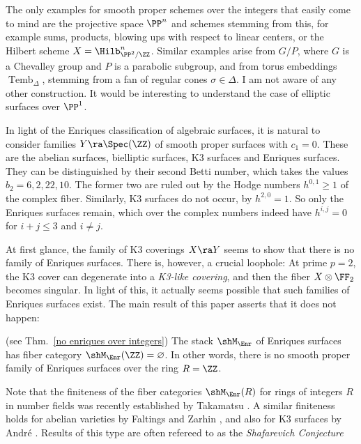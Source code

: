 The only examples for smooth proper schemes over the integers that easily come to mind
are  the projective space $\PP^n$ and schemes   stemming from this,
for example sums, products,   blowing ups with respect to linear centers, or the Hilbert scheme
$X=\Hilb^n_{\PP^2/\ZZ}$.
Similar examples arise from $G/P$, where $G$ is a Chevalley group  and $P$ is a  parabolic subgroup,
and from   torus embeddings $\operatorname{Temb}_\Delta$, stemming from a  fan of regular cones $\sigma\in\Delta$.
I am not aware of any other construction. It would be interesting to understand the case of   elliptic surfaces over $\PP^1$.

In light of the Enriques classification of algebraic surfaces, it is natural to consider  families
$Y\ra \Spec(\ZZ)$ of smooth proper surfaces with $c_1=0$.
These are the abelian surfaces, bielliptic surfaces, K3 surfaces and Enriques surfaces.
They can be distinguished by their second Betti number, which takes the   values $b_2=6,2,22,10$.
The former two are ruled out by the Hodge numbers $h^{0,1}\geq 1$ of the complex fiber. Similarly, K3 surfaces do not
occur, by $h^{2,0}=1$.
So only the Enriques surfaces remain, which over the complex numbers indeed have $h^{i,j}=0$ for $i+j\leq 3$ and $i\neq j$.

At first glance, the family of  K3 coverings $X\ra Y$ seems to show that there is no   family of Enriques surfaces.
There is, however, a  crucial loophole: At prime $p=2$, the K3 cover can degenerate into a \emph{K3-like covering}, and then
the fiber $X\otimes\FF_2$ becomes singular. In light of this, it actually seems    possible that
such families of Enriques surfaces exist. The main result of this paper asserts that it does not happen:

\begin{maintheorem}
\notready
{\rm (see Thm.\ \ref{no enriques over integers})}
The   stack $\shM_\Enr$ of Enriques surfaces
has fiber category $\shM_\Enr(\ZZ)=\varnothing$. In other words,
there is no smooth proper family  of Enriques surfaces over the ring $R=\ZZ$.
\end{maintheorem}

Note that the finiteness of the fiber categories $\shM_\Enr(R)$ for rings of integers $R$ in   number fields  was recently
established by Takamatsu \cite{Takamatsu-2019}. A similar finiteness holds for abelian varieties
by Faltings \cite{Faltings-1983} and Zarhin \cite{Zarhin-1985}, and also for K3 surfaces by Andr\'e \cite{Andre-1996}.
Results of this type are often refereed to as the \emph{Shafarevich Conjecture} \cite{Shafarevich-1963}

